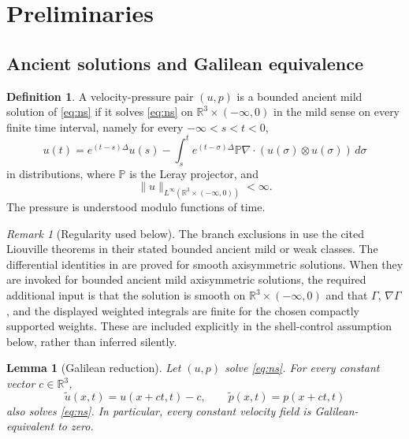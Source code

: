 \documentclass[11pt]{amsart}
\theoremstyle{plain}
\newtheorem{lemma}[theorem]{Lemma}
\theoremstyle{definition}
\newtheorem{definition}[theorem]{Definition}
\theoremstyle{remark}
\newtheorem{remark}[theorem]{Remark}
\numberwithin{equation}{section}
\begin{document}
\section{Preliminaries}

\subsection{Ancient solutions and Galilean equivalence}

\begin{definition}\label{def:ancient}
A velocity-pressure pair \((u,p)\) is a bounded ancient mild solution of
\eqref{eq:ns} if it solves \eqref{eq:ns} on
\(\mathbb R^3\times(-\infty,0)\) in the mild sense on every finite time
interval, namely for every \(-\infty<s<t<0\),
\begin{equation}\label{eq:mild-ns}
   u(t)=e^{(t-s)\Delta}u(s)
   -\int_s^t e^{(t-\sigma)\Delta}\mathbb P\nabla\cdot
      (u(\sigma)\otimes u(\sigma))\,d\sigma
\end{equation}
in distributions, where \(\mathbb P\) is the Leray projector, and
\[
   \|u\|_{L^\infty(\mathbb R^3\times(-\infty,0))}<\infty .
\]
The pressure is understood modulo functions of time.
\end{definition}

\begin{remark}[Regularity used below]\label{rem:regularity}
The branch exclusions in 
use the cited Liouville theorems in their stated bounded ancient mild or weak
classes.  The differential identities in 
are proved for smooth axisymmetric solutions.  When they are invoked for
bounded ancient mild axisymmetric solutions, the required additional input is
that the solution is smooth on \(\mathbb R^3\times(-\infty,0)\) and that
\(\Gamma\), \(\nabla\Gamma\), and the displayed weighted integrals are finite
for the chosen compactly supported weights.  These are included explicitly in
the shell-control assumption below, rather than inferred silently.
\end{remark}

\begin{lemma}[Galilean reduction]\label{lem:galilean}
Let \((u,p)\) solve \eqref{eq:ns}.  For every constant vector \(c\in\mathbb R^3\),
\[
   \widetilde u(x,t)=u(x+ct,t)-c,\qquad
   \widetilde p(x,t)=p(x+ct,t)
\]
also solves \eqref{eq:ns}.  In particular, every constant velocity field is
Galilean-equivalent to zero.
\end{lemma}
\end{document}
